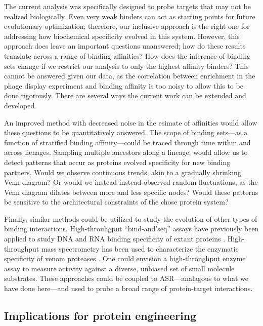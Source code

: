 The current analysis was specifically designed to probe targets that
may not be realized biologically. Even very weak binders can act as
starting points for future evolutionary optimization; therefore, our
inclusive approach is the right one for addressing how biochemical
specificity evolved in this system. However, this approach does leave
an important questions unanswered; how do these results translate
across a range of binding affinities? How does the inference of binding
sets change if we restrict our analysis to only the highest affinity
binders? This cannot be answered given our data, as the correlation
between enrichment in the phage display experiment and binding affinity
is too noisy to allow this to be done rigorously. There are several
ways the current work can be extended and developed. 

An improved method with decreased noise in the esimate of affinities
would allow these questions to be quantitatively answered. The scope
of binding sets---as a function of stratified binding affinity---could
be traced through time within and across lienages. Sampling multiple
ancestors along a lineage, would allow us to detect patterns that
occur as proteins evolved specificity for new binding partners. Would
we observe continuous trends, akin to a gradually shrinking Venn diagram?
Or would we instead instead observed random fluctuations, as the Venn
diagram dilates between more and less specific nodes? Would these
patterns be sensitive to the architectural constraints of the chose
protein system?

Finally, similar methods could be utilized to study the evolution
of other types of binding interactions. High-throuhgput ``bind-and'seq''
assays have previously been applied to study DNA and RNA binding specificity
of extant proteins \citep{carlson_specificity_2010,slattery_cofactor_2011,miranda_rna_2017,starr_alternative_2017}.
High-throughput mass spectrometry has been used to characterize the
enzymatic specificity of venom proteases \citep{zelanis_snake_2015}.
One could envision a high-throughput enzyme assay to measure activity
against a diverse, unbiased set of small molecule substrates. These
approaches could be coupled to ASR---analagous to what we have done
here---and used to probe a broad range of protein-target interactions. 

\subsection{Implications for protein engineering}

